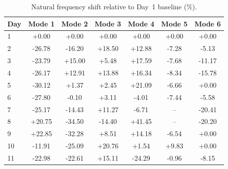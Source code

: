 \begin{table}[htbp]
\centering
\caption{Natural frequency shift relative to Day~1 baseline (\%).}
\label{tab:freq_shift}
\begin{tabular}{lcccccc}
\toprule
Day & Mode 1 & Mode 2 & Mode 3 & Mode 4 & Mode 5 & Mode 6 \\
\midrule
1 & +0.00 & +0.00 & +0.00 & +0.00 & +0.00 & +0.00 \\
2 & -26.78 & -16.20 & +18.50 & +12.88 & -7.28 & -5.13 \\
3 & -23.79 & +15.00 & +5.48 & +17.59 & -7.68 & -11.17 \\
4 & -26.17 & +12.91 & +13.88 & +16.34 & -8.34 & -15.78 \\
5 & -30.12 & +1.37 & +2.45 & +21.09 & -6.66 & +0.00 \\
6 & -27.80 & -0.10 & +3.11 & -4.01 & -7.44 & -5.58 \\
7 & -25.17 & -14.43 & +11.27 & -6.71 & -- & -20.41 \\
8 & +20.75 & -34.50 & -14.40 & +41.45 & -- & -20.20 \\
9 & +22.85 & -32.28 & +8.51 & +14.18 & -6.54 & +0.00 \\
10 & -11.91 & -25.09 & +20.76 & +1.54 & +9.83 & +0.00 \\
11 & -22.98 & -22.61 & +15.11 & -24.29 & -0.96 & -8.15 \\
\bottomrule
\end{tabular}
\end{table}